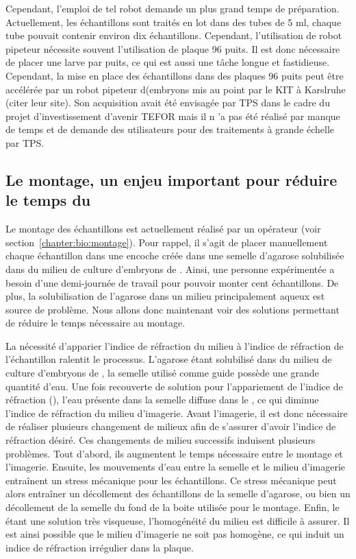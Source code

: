 \documentclass[\main/main.tex]{subfiles}
\begin{document}
%
Cependant, l'emploi de tel robot demande un plus grand temps de préparation.
%
Actuellement, les échantillons sont traités en lot dans des tubes de 5 ml,
chaque tube pouvait contenir environ dix échantillons.
%
Cependant, l'utilisation de robot pipeteur nécessite souvent l'utilisation de plaque 96 puits.
%
Il est donc nécessaire de placer une larve par puits,
ce qui est aussi une tâche longue et fastidieuse.
%
Cependant, la mise en place des échantillons dans des plaques 96 puits peut être accélérée par un robot pipeteur d(embryons mis au point par le KIT à Karslruhe (citer leur site). Son acquisition avait été envisagée par TPS dans le cadre du projet d'investissement d'avenir TEFOR mais il n 'a pas été réalisé par manque de temps et de demande des utilisateurs pour des traitements à grande échelle par TPS.

    \subsection{Le montage, un enjeu important pour réduire le temps du \hcs{}}

%    
Le montage des échantillons est actuellement réalisé par un opérateur (voir section~\ref{chapter:bio:montage}).
%
Pour rappel, il s'agit de placer manuellement chaque échantillon dans une encoche créée dans une semelle d'agarose solubilisée dans du milieu de culture d'embryons de \pzs{}.
%
Ainsi, une personne expérimentée a besoin d'une demi-journée de travail pour pouvoir monter cent échantillons.
%
De plus, la solubilisation de l'agarose dans un milieu principalement aqueux est source de problème.
%
Nous allons donc maintenant voir des solutions permettant de réduire le temps nécessaire au montage.

La nécessité d'apparier l'indice de réfraction du milieu à l'indice de réfraction de l'échantillon ralentit le processus.
%
L'agarose étant solubilisé dans du milieu de culture d'embryons de \pz{},
la semelle utilisé comme guide possède une grande quantité d'eau.
%
Une fois recouverte de solution pour l'appariement de l'indice de réfraction (\MD{}),
l'eau présente dans la semelle diffuse dans le \MD{}, ce qui diminue l'indice de réfraction du milieu d'imagerie.
%
Avant l'imagerie,
il est donc nécessaire de réaliser plusieurs changement de milieux afin de s'assurer d'avoir l'indice de réfraction désiré.
%
Ces changements de milieu successifs induisent plusieurs problèmes. Tout d'abord, ils augmentent le temps nécessaire entre le montage et l'imagerie.
%
Ensuite, les mouvements d'eau entre la semelle et le milieu d'imagerie entraînent un stress mécanique pour les échantillons.
%
Ce stress mécanique peut alors entraîner un décollement des échantillons de la semelle d'agarose,
ou bien un décollement de la semelle du fond de la boite utilisée pour le montage.
%
Enfin, le \MD{} étant une solution très visqueuse,  l'homogénéité du milieu est difficile à assurer.
%
Il est ainsi possible que le milieu d'imagerie ne soit pas homogène, ce qui induit un indice de réfraction irrégulier dans la plaque.
\end{document}
